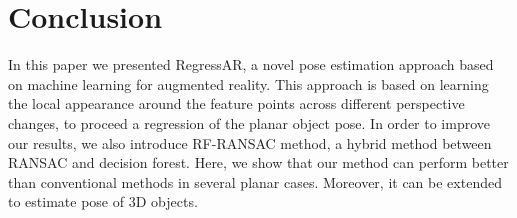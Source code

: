 \documentclass[annual]{acmsiggraph}
\begin{document}
%
  
 	

\section{Conclusion}
\label{sec:conclusion}

In this paper we presented RegressAR, a novel pose estimation approach based on machine learning for augmented reality. This approach is based on learning the local appearance around the feature points across different perspective changes, to proceed a regression of the planar object pose. In order to improve our results, we also introduce RF-RANSAC method, a hybrid method between RANSAC and decision forest. Here, we show that our method can perform better than conventional methods in several planar cases. Moreover, it can be extended to estimate pose of 3D objects. 
\end{document}
